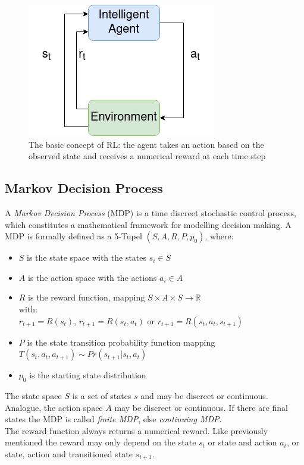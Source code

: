 \begin{figure}
	\centering
	\includegraphics[width=0.4\linewidth]{figures/rl.png}
	\caption{The basic concept of RL: the agent takes an action based on the observed state and receives a numerical reward at each time step}
	\label{fig:rl}
\end{figure}

\newpage

\subsection{Markov Decision Process} \label{sec:MDP}
A \emph{Markov Decision Process} (MDP) is a time discreet stochastic control process, which constitutes a mathematical framework for modelling decision making. A MDP is formally defined as a 5-Tupel $(S,A,R,P,p_0)$, where:
\begin{itemize}
	\item $S$ is the state space with the states $s_i \in S$ 
	\item $A$ is the action space with the actions $a_i \in A$
	\item $R$ is the reward function, mapping $S \times A \times S \to \mathbb{R}$\\
				with:\\
				$r_{t+1} = R(s_t)$, $r_{t+1} = R(s_t, a_t)$ or $r_{t+1} = R(s_t, a_t, s_{t+1})$
	\item $P$ is the state transition probability function mapping $T(s_t,a_t,a_{t+1}) \sim Pr(s_{t+1}|s_t,a_t)$
	\item $p_0$ is the starting state distribution 
\end{itemize}
The state space $S$ is a set of states $s$ and may be discreet or continuous. Analogue, the action space $A$ may be discreet or continuous. If there are final states the MDP is called \emph{finite MDP}, else \emph{continuing MDP}. \\
The reward function always returns a numerical reward. Like previously mentioned the reward may only depend on the state $s_t$ or state and action $a_t$, or state, action and transitioned state $s_{t+1}$. \\
